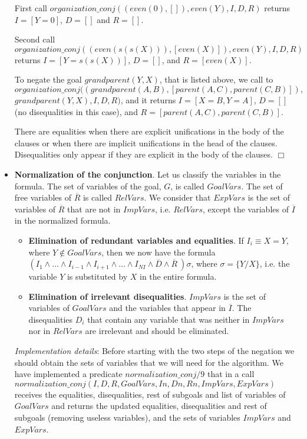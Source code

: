 \documentclass{tlp}
\begin{document}
\begin{itemize}
First call $organization\_conj((even(0),[]),even(Y),I,D,R)$ returns $I=[Y=0]$,
$D=[]$ and $R=[]$.

Second call $organization\_conj((even(s(s(X))),[even(X)]),even(Y),I,D,R)$
returns $I=[Y=s(s(X))]$, $D=[]$, and $R=[even(X)]$.

To negate the goal $grandparent(Y,X)$, that is listed above, we call to \\
$organization\_conj((grandparent(A,B),[parent(A,C),parent(C,B)]),$ \\
$grandparent(Y,X),I,D,R)$,
and it returns $I=[X=B,Y=A]$, $D=[]$ (no disequalities in this case), and $R=[parent(A,C),parent(C,B)]$.

There are equalities when there are explicit unifications in the body of the
clauses or when there are implicit unifications in the head of the
clauses. Disequalities only appear if they are explicit in the body of the
clauses. $\Box$

\item {\bf Normalization of the conjunction}. Let us classify the variables in
the formula. The set of variables of the goal, $G$, is called $GoalVars$. The
set of free variables of $\overline{R}$ is called $RelVars$. We consider that
$ExpVars$ is the set of variables of $\overline{R}$ that are not in $ImpVars$,
i.e. $RelVars$, except the variables of $\overline{I}$ in the normalized
formula.

    \begin{itemize}

       \item {\bf Elimination of redundant variables and equalities}. If $I_i
       \equiv X = Y$, where $Y \not\in GoalVars$, then we now have the formula
       $ ( I_1 \wedge \ldots \wedge I_{i-1} \wedge I_{i+1} \wedge \ldots
       \wedge I_{NI} \wedge \overline{D} \wedge \overline{R}~) \sigma $, where
       $ \sigma = \{ Y / X \}$, i.e. the variable $Y$ is substituted by $X$ in
       the entire formula.
       \item {\bf Elimination of irrelevant disequalities}. $ImpVars$
       is the set of variables of $GoalVars$ and the variables that
       appear in $\overline{I}$. The disequalities $D_i$ that contain
       any variable that was neither in $ImpVars$ nor in $RelVars$ are
       irrelevant and should be eliminated.

    \end{itemize}
\noindent
\emph{Implementation details}: Before starting with the two steps of the
negation we should obtain the sets of variables that we will need for the
algorithm. We have implemented a predicate $normalization\_conj/9$ that in a
call  \\
$normalization\_conj(I,D,R,GoalVars,In,Dn,Rn,ImpVars,ExpVars)$ receives
the equalities, disequalities, rest of subgoals and list of variables of
$GoalVars$ and returns the updated equalities, disequalities and rest of
subgoals (removing useless variables), and the sets of variables $ImpVars$ and
$ExpVars$.


\end{itemize}
\end{document}
